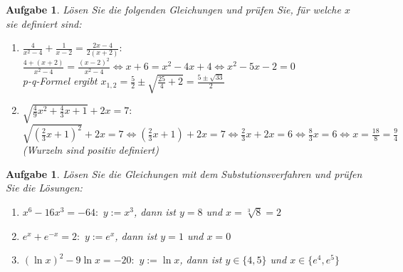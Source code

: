 \documentclass[12pt]{article}
\newtheorem{exercise}[satz]{Aufgabe}
\begin{document}
   \begin{exercise}
  L\"osen Sie die folgenden Gleichungen und pr\"ufen Sie, f\"ur welche $x$ sie definiert sind:
  \begin{enumerate}
  \item[(a)] $\frac{4}{x^2-4}+\frac{1}{x-2} = \frac{2x-4}{2(x+2)}:$ \\         
             $\frac{4+(x+2)}{x^2-4}=\frac{(x-2)^2}{x^2-4}\Leftrightarrow x+6=x^2-4x+4
             \Leftrightarrow x^2-5x-2 = 0$\\
             p-q-Formel ergibt $x_{1,2} = \frac{5}{2}\pm\sqrt{\frac{25}{4}+2}=\frac{5\pm\sqrt{33}}{2}$

  \item[(b)] $\sqrt{\frac{4}{9}x^2+\frac{4}{3}x+1}+2x=7:$ \\ 
             $\sqrt{(\frac{2}{3}x+1)^2}+2x=7 \Leftrightarrow (\frac{2}{3}x+1)+2x=7\Leftrightarrow \frac{2}{3}x+2x=6 \Leftrightarrow \frac{8}{3}x = 6 \Leftrightarrow x=\frac{18}{8}=\frac{9}{4}$
             (Wurzeln sind positiv definiert)
  \end{enumerate}
   \end{exercise} 

   \begin{exercise}
  L\"osen Sie die Gleichungen mit dem Substutionsverfahren und pr\"ufen Sie die L\"osungen:
  \begin{enumerate}
  \item[(a)] $x^6-16x^3=-64:\,\, y:=x^3$, dann ist $y = 8$ und $x=\sqrt[3]{8}=2$
  \item[(b)] $e^x+e^{-x}=2:\,\, y:=e^x$, dann ist $y = 1$ und $x=0$
  \item[(c)] $(\ln{x})^2-9\ln{x}=-20:\,\, y:=\ln{x}$, dann ist $y\in\{4,5\}$ und $x\in\{e^4,e^5\}$
  \end{enumerate}
   \end{exercise}
\end{document}
